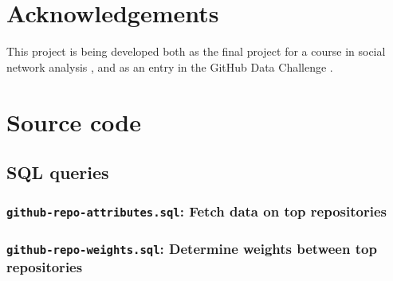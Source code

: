 \documentclass[twocolumn]{article}
\begin{document}
\section{Acknowledgements}
This project is being developed both as the final project for a course in social
network analysis \cite{snacourse}, and as an entry in the GitHub Data Challenge
\cite{doll13}.




\onecolumn
\appendix
\section{Source code}
\subsection{SQL queries}
\label{app:sql}

\subsubsection{\texttt{github-repo-attributes.sql}: Fetch data on top
repositories}


\subsubsection{\texttt{github-repo-weights.sql}: Determine weights between top
repositories}

\end{document}
